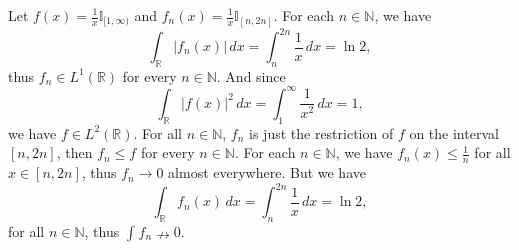 \documentclass[12pt,a4paper]{ctexart}
\begin{document}
Let $f(x) = \frac{1}{x} \mathbb{I}_{[1, \infty)}$ and $f_{n}(x) = \frac{1}{x} \mathbb{I}_{[n, 2 n]}$. For each $n \in \mathbb N$, we have
\begin{equation*}
\int_{\mathbb{R}}^{} |f_{n}(x)| \, d x = \int_{n}^{2 n} \frac{1}{x} \, d x = \ln{2},
\end{equation*}
thus $f_{n} \in L^{1}(\mathbb{R})$ for every $n \in \mathbb{N}$. And since
\begin{equation*}
\int_{\mathbb{R}}^{} |f(x)|^{2} \, d x = \int_{1}^{ \infty} \frac{1}{x^{2}} \, d x = 1,
\end{equation*}
we have $f \in L^{2}(\mathbb{R})$. For all $n \in \mathbb N$, $f_{n}$ is just the restriction of $f$ on the interval $[n, 2n]$, then $f_{n} \leq f$ for every $n \in \mathbb{N}$. For each $n \in \mathbb N$, we have $f_{n}(x) \leq \frac{1}{n}$ for all $x \in [n, 2n]$, thus $f_{n} \to 0$ almost everywhere. But we have
\begin{equation*}
\int_{\mathbb{R}}^{} f_{n}(x) \, d x = \int_{n}^{2 n} \frac{1}{x} \, d x = \ln{2},
\end{equation*}
for all $n \in \mathbb N$, thus $\int_{}^{} f_{n} \nrightarrow 0$.
\end{document}
